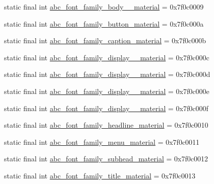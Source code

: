 \begin{DoxyCompactItemize}
\item 
static final int \mbox{\hyperlink{classcom_1_1synnapps_1_1carouselview_1_1_r_1_1string_abcaa55a638e1a6b2c09e84bc942dcc94}{abc\+\_\+font\+\_\+family\+\_\+body\+\_\+\_\+material}} = 0x7f0c0009
\item 
static final int \mbox{\hyperlink{classcom_1_1synnapps_1_1carouselview_1_1_r_1_1string_ab00aeca9395ba99e8b3e95a8ea2eaf21}{abc\+\_\+font\+\_\+family\+\_\+button\+\_\+material}} = 0x7f0c000a
\item 
static final int \mbox{\hyperlink{classcom_1_1synnapps_1_1carouselview_1_1_r_1_1string_ad9ce3700d4e418a53cdf9421c892b945}{abc\+\_\+font\+\_\+family\+\_\+caption\+\_\+material}} = 0x7f0c000b
\item 
static final int \mbox{\hyperlink{classcom_1_1synnapps_1_1carouselview_1_1_r_1_1string_abc58b9c481ba492c62b73cc0c3607ca5}{abc\+\_\+font\+\_\+family\+\_\+display\+\_\+\_\+material}} = 0x7f0c000c
\item 
static final int \mbox{\hyperlink{classcom_1_1synnapps_1_1carouselview_1_1_r_1_1string_afc69722c72a193c24754e9f39e7e0337}{abc\+\_\+font\+\_\+family\+\_\+display\+\_\+\_\+material}} = 0x7f0c000d
\item 
static final int \mbox{\hyperlink{classcom_1_1synnapps_1_1carouselview_1_1_r_1_1string_a72d9f19a8039edf4678754c375969cdc}{abc\+\_\+font\+\_\+family\+\_\+display\+\_\+\_\+material}} = 0x7f0c000e
\item 
static final int \mbox{\hyperlink{classcom_1_1synnapps_1_1carouselview_1_1_r_1_1string_adf45d522c05b285e8a4fc68d1d6de840}{abc\+\_\+font\+\_\+family\+\_\+display\+\_\+\_\+material}} = 0x7f0c000f
\item 
static final int \mbox{\hyperlink{classcom_1_1synnapps_1_1carouselview_1_1_r_1_1string_a23372eeadf7b27b2b1387c304970794f}{abc\+\_\+font\+\_\+family\+\_\+headline\+\_\+material}} = 0x7f0c0010
\item 
static final int \mbox{\hyperlink{classcom_1_1synnapps_1_1carouselview_1_1_r_1_1string_af0acfb0550ec5776dfac858050745e52}{abc\+\_\+font\+\_\+family\+\_\+menu\+\_\+material}} = 0x7f0c0011
\item 
static final int \mbox{\hyperlink{classcom_1_1synnapps_1_1carouselview_1_1_r_1_1string_a90a1e30a44681a77f4a40f963cd55cd8}{abc\+\_\+font\+\_\+family\+\_\+subhead\+\_\+material}} = 0x7f0c0012
\item 
static final int \mbox{\hyperlink{classcom_1_1synnapps_1_1carouselview_1_1_r_1_1string_acc5a6b61683c9478af9ea7e42589b1be}{abc\+\_\+font\+\_\+family\+\_\+title\+\_\+material}} = 0x7f0c0013

\end{DoxyCompactItemize}
